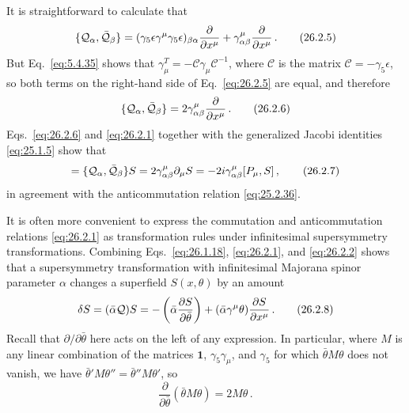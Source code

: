 It is straightforward to calculate that
\begin{equation}
  \{\mathcal{Q}_\alpha,\bar{\mathcal{Q}}_\beta\}
  =(\gamma_5\epsilon\gamma^\mu\gamma_5\epsilon)_{\beta\alpha}
    \frac{\partial}{\partial x^\mu}
  +\gamma^\mu_{\alpha\beta}\frac{\partial}{\partial x^\mu}\,.
  \tag{26.2.5}\label{eq:26.2.5}
\end{equation}
But Eq.~\eqref{eq:5.4.35} shows that
$\gamma_\mu^T=-\mathcal{C}\gamma_\mu\mathcal{C}^{-1}$, where $\mathcal{C}$ is
the matrix $\mathcal{C}=-\gamma_5\epsilon$, so both terms on the right-hand
side of Eq.~\eqref{eq:26.2.5} are equal, and therefore
\begin{equation}
  \{\mathcal{Q}_\alpha,\bar{\mathcal{Q}}_\beta\}
  =2\gamma^\mu_{\alpha\beta}\frac{\partial}{\partial x^\mu}\,.
  \tag{26.2.6}\label{eq:26.2.6}
\end{equation}
Eqs.~\eqref{eq:26.2.6} and \eqref{eq:26.2.1} together with the generalized
Jacobi identities \eqref{eq:25.1.5} show that
\begin{equation}
  [\{Q_\alpha,\bar Q_\beta\},S]
  =\{\SuperQ_\alpha,\bar{\SuperQ}_\beta\}S
  =2\gamma^\mu_{\alpha\beta}\partial_\mu S
  =-2i\gamma^\mu_{\alpha\beta}[P_\mu,S]\,,
  \tag{26.2.7}\label{eq:26.2.7}
\end{equation}
in agreement with the anticommutation relation \eqref{eq:25.2.36}.

It is often more convenient to express the commutation and anticommutation
relations \eqref{eq:26.2.1} as transformation rules under infinitesimal
supersymmetry transformations. Combining Eqs.~\eqref{eq:26.1.18},
\eqref{eq:26.2.1}, and \eqref{eq:26.2.2} shows that a supersymmetry
transformation with infinitesimal Majorana spinor parameter $\alpha$ changes a
superfield $S(x,\theta)$ by an amount
\begin{equation}
  \delta S=(\bar\alpha\mathcal{Q})S
  =-\left(\bar\alpha\frac{\partial S}{\partial\bar\theta}\right)
  +(\bar\alpha\gamma^\mu\theta)\frac{\partial S}{\partial x^\mu}\,.
  \tag{26.2.8}\label{eq:26.2.8}
\end{equation}
Recall that $\partial/\partial\bar\theta$ here acts on the left of any
expression. In particular, where $M$ is any linear combination of the
matrices $\mathbf{1}$, $\gamma_5\gamma_\mu$, and $\gamma_5$ for which
$\bar\theta M\theta$ does not vanish, we have
$\bar\theta'M\theta''=\bar\theta''M\theta'$, so
\begin{equation}
  \frac{\partial}{\partial\bar\theta}
  (\bar\theta M\theta)=2M\theta\,.
  \tag{26.2.9}\label{eq:26.2.9}
\end{equation}

